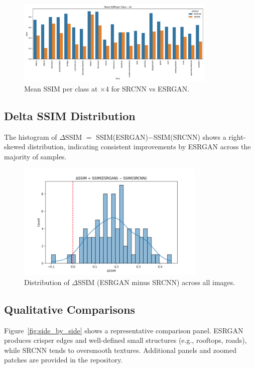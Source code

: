 \documentclass[]{spie}
\begin{document}
\begin{figure}[h!]
\centering
\includegraphics[width=0.85\textwidth]{ssim_per_class_x4.png}
\caption{Mean SSIM per class at $\times4$ for SRCNN vs ESRGAN.}
\label{fig:ssim_x4}
\end{figure}

\subsection{Delta SSIM Distribution}
The histogram of $\Delta$SSIM $=$ SSIM(ESRGAN)$-$SSIM(SRCNN) shows a right-skewed distribution, indicating consistent improvements by ESRGAN across the majority of samples.

\begin{figure}[h!]
\centering
\includegraphics[width=0.8\textwidth]{delta_ssim_hist.png}
\caption{Distribution of $\Delta$SSIM (ESRGAN minus SRCNN) across all images.}
\label{fig:delta_ssim}
\end{figure}

\subsection{Qualitative Comparisons}
Figure~\ref{fig:side_by_side} shows a representative comparison panel. ESRGAN produces crisper edges and well-defined small structures (e.g., rooftops, roads), while SRCNN tends to oversmooth textures. Additional panels and zoomed patches are provided in the repository.
\end{document}
